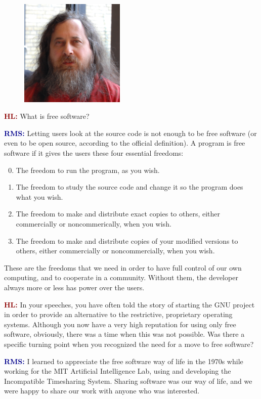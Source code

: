 \documentclass{article}
\newcommand{\hl}{\textcolor{DarkRed}{\textbf{HL: }}}
\newcommand{\rms}{\textcolor{DarkBlue}{\textbf{RMS: }}}
\begin{document}
\newpage

\begin{figure}
\includegraphics[width=5cm]{rms.jpg}
\end{figure}
\hl What is free software?

\rms Letting users look at the source code is not enough to be free software (or even to be open source, according to the official definition).  A program is free software if it gives the users these four essential freedoms:
\begin{enumerate}[topsep=0pt, itemsep=0pt]
\setcounter{enumi}{-1}
\item The freedom to run the program, as you wish.
\item The freedom to study the source code and change it so the program does what you wish.
\item The freedom to make and distribute exact copies to others, either commercially or noncommerically, when you wish.
\item The freedom to make and distribute copies of your modified versions to others, either commercially or noncommercially, when you wish.
\end{enumerate}
These are the freedoms that we need in order to have full control of our own computing, and to cooperate in a community. Without them, the developer always more or less has power over the users.

\hl In your speeches, you have often told the story of starting the GNU project in order to provide an alternative to the restrictive, proprietary operating systems. Although you now have a very high reputation for using only free software, obviously, there was a time when this was not possible. Was there a specific turning point when you recognized the need for a move to free software?

\rms I learned to appreciate the free software way of life in the 1970s while working for the MIT Artificial Intelligence Lab, using and developing the Incompatible Timesharing System. Sharing software was our way of life, and we were happy to share our work with anyone who was interested.
\end{document}

